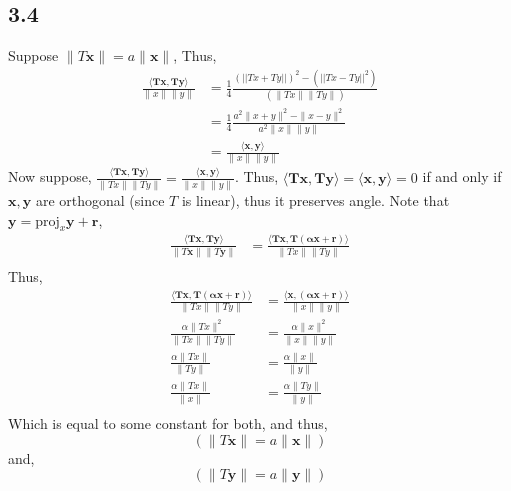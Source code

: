 \documentclass[letterpaper,12pt]{article}
\theoremstyle{definition}
\begin{document}
\subsection*{3.4}
Suppose $\|T \mathbf{x}\| = a\|\mathbf{x}\|$, Thus,
\begin{align*}
    \frac{\langle \mathbf{Tx}, \mathbf{Ty} \rangle  }{\|x\|\|y\|} & =
    \frac{1}{4} \frac{(||Tx + Ty||)^2 - (||Tx-Ty||^2)}{(\|Tx\|\|Ty\|)} \\
    & = \frac{1}{4} \frac{ a^2 \|x+y\| ^2 - \|x-y\|^2}{a^2 \|x\|\|y\|} \\
    & = \frac{\langle \mathbf{x}, \mathbf{y} \rangle }{ \|x\| \|y\|}
\end{align*}
Now suppose, $\frac{\langle \mathbf{Tx}, \mathbf{Ty} \rangle }{\|Tx\|\|Ty\|} = \frac{\langle \mathbf{x}, \mathbf{y} \rangle }{\|x\|\|y\|} $. Thus, $\langle \mathbf{Tx}, \mathbf{Ty} \rangle = \langle \mathbf{x}, \mathbf{y} \rangle  = 0 $ if and only if $\mathbf{x},\mathbf{y}$ are orthogonal (since $T$ is linear), thus it preserves angle.
Note that $\mathbf{y} = \text{proj}_x \mathbf{y} + \mathbf{r}$, 
\begin{align*}
    \frac{\langle \mathbf{Tx}, \mathbf{Ty} \rangle 
}{\|T \mathbf{x} \| \| T \mathbf{y}\|} 
& = \frac{\langle \mathbf{Tx}, \mathbf{T(\alpha \mathbf{x} + \mathbf{r})} \rangle }{\|Tx\|\|Ty\|} \\
\end{align*}
Thus, 
\begin{align*}
\frac{\langle \mathbf{Tx}, \mathbf{T(\alpha \mathbf{x} + \mathbf{r})} \rangle }{\|Tx\|\|Ty\|} & = \frac{\langle \mathbf{x}, \mathbf{(\alpha \mathbf{x} + \mathbf{r})} \rangle }{\|x\|\|y\|}\\
\frac{\alpha \|Tx\|^2}{\|Tx\|\|Ty\|} & = \frac{\alpha \|x\|^2}{\|x\|\|y\|} \\
\frac{\alpha \|Tx\|}{\|Ty\|} & = \frac{\alpha \|x\|}{\|y\|} \\
\frac{\alpha \|Tx\|}{\|x\|} & = \frac{\alpha \|Ty\|}{\|y\|} \\
\end{align*}
Which is equal to some constant for both, and thus, 
\begin{equation*}
    (\|T \mathbf{x} \| = a \|\mathbf{x}\|)
\end{equation*}
and,
\begin{equation*}
    (\|T \mathbf{y} \| = a \|\mathbf{y}\|)
\end{equation*}
\end{document}
